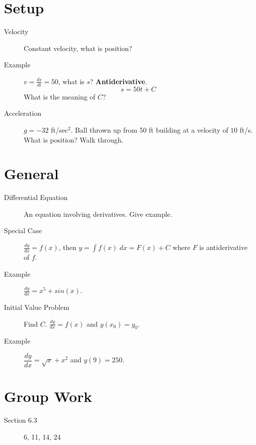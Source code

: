 \documentclass[11pt]{article}
\begin{document}
\drawtitle

\section*{Setup}
\begin{description}
\item[Velocity] Constant velocity, what is position?
\item[Example] $v=\frac{ds}{dt}=50$, what is $s$?
  \textbf{Antiderivative}.
  \[
  s=50t+C
  \]
  What is the meaning of $C$?
\item[Acceleration] $g=-32$ ft/sec$^2$.  Ball thrown up from 50 ft
  building at a velocity of $10$ ft/s.  What is position?  Walk through.
\end{description}

\section*{General}
\begin{description}
\item[Differential Equation] An equation involving derivatives.  Give
  example.
\item[Special Case] $\frac{dy}{dx}=f(x)$, then $y=\int
  f(x)\;dx=F(x)+C$ where $F$ is antiderivative of $f$.
\item[Example] $\frac{dy}{dx}=x^5+sin(x)$.
\item[Initial Value Problem] Find $C$. $\frac{dy}{dx}=f(x)$ and $y(x_0)=y_0$.
\item[Example] $\dfrac{dy}{dx}=\sqrt{x}+x^2$ and $y(9)=250$.
\end{description}

\section*{Group Work}
\begin{description}
\item[Section 6.3] 6, 11, 14, 24
\end{description}
\end{document}
